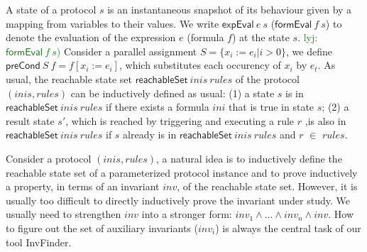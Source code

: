 \documentclass{llncs}
\newcommand\lyj[1]{\textcolor{green}{lyj: #1}}
\begin{document}
A  state of a protocol $s$ is an instantaneous snapshot of its
behaviour given by a mapping from variables to their values. We
write $\mathsf{expEval}~e~s$ ($\mathsf{formEval}~f~s$) to denote the
evaluation of the expression $e$ (formula $f$) at the state $s$.
\lyj{$\mathsf{formEval}~f~s$)} Consider a parallel assignment
$S=\{x_i:=e_i | i>0\}$, we define
$\mathsf{preCond}~S~f=f[x_i:=e_i]$, which substitutes each occurency
of $x_i$ by $e_t$. As usual, the reachable state set
$\mathsf{reachableSet}~ inis ~rules$ of the protocol $(inis,rules)$
can be inductively defined as usual: (1) a state $s$ is in
$\mathsf{reachableSet}~inis~ rules$ if
 there exists a formula $ini$ that is true in state $s$; (2) a result state $s'$, which is reached by triggering and
 executing a rule $r$ ,is also in
 $\mathsf{reachableSet}~inis~ rules$ if $s$ already is in
 $\mathsf{reachableSet}~inis~ rules$ and $r $ $\in$  $rules$.

Consider a protocol $(inis,rules)$, a natural
idea is to inductively define the reachable state set of a
parameterized protocol instance and to prove inductively a
property, in terms of an invariant $inv$, of the reachable state set.
However, it is usually too difficult to directly inductively prove the invariant under study.
We usually need to strengthen $inv$ into a stronger form:
$inv_1\wedge ...\wedge inv_n \wedge inv$.
How to figure out the set of auxiliary invariants ($inv_i$)
is always the central task of our tool {\sf InvFinder}.
\end{document}
